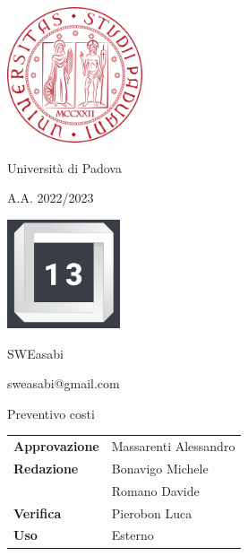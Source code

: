 \documentclass{article}
\begin{document}
\begin{center}
    
    \includegraphics[width=0.3\textwidth]{immagini/logo_unipd.png}

    Università di Padova
    
    A.A. 2022/2023
    
    \vspace{4cm}

    \includegraphics[width=0.25\textwidth]{immagini/logo_13.png}
    
    \Large SWEasabi

    \small sweasabi@gmail.com
        
    \vspace{2cm}

    \Huge Preventivo costi
        
    \vspace{2cm}
    
    \normalsize
    \begin{center}
        \begin{tabularx}{7cm}{l | X}            
            \textbf{Approvazione} & Massarenti Alessandro\\
            \textbf{Redazione} & Bonavigo Michele \\
            & Romano Davide\\
            \textbf{Verifica} & Pierobon Luca\\
            \textbf{Uso} & Esterno\\
        \end{tabularx}
    \end{center}
        
\end{center}

\newpage

\tableofcontents

\newpage


\end{document}
